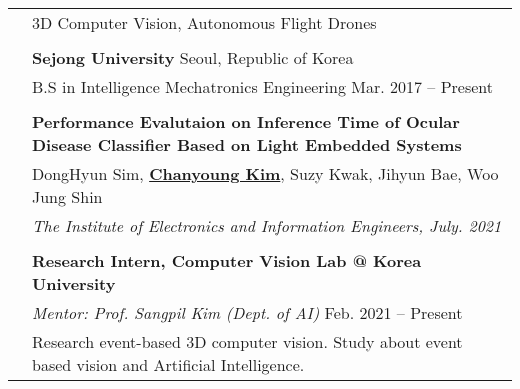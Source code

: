 \documentclass[letterpaper, 11pt]{article}
\begin{document}
\begin{longtable}{p{1.3in}p{4.8in}}


\nohyphens{\color{Violet}{Research interests}}
& 3D Computer Vision, Autonomous Flight Drones \\
& \\


\color{Violet}{Education} 
& \textbf{Sejong University} \hfill Seoul, Republic of Korea \\ 
& B.S in Intelligence Mechatronics Engineering \hfill Mar. 2017 -- Present \\
& \\




\nohyphens{\color{Violet}{Publications}} 

& \textbf{Performance Evalutaion on Inference 
Time of Ocular Disease Classifier Based on Light Embedded 
Systems} \\
& DongHyun Sim, \uline{\textbf{Chanyoung Kim}}, Suzy Kwak, Jihyun Bae, Woo Jung 
Shin \\
& \textit{The Institute of Electronics and Information Engineers, July. 
2021}\\
& \\



\nohyphens{\color{Violet}{Research experience}} 
& \textbf{Research Intern, Computer Vision Lab @ Korea University} \\
& {\it Mentor: Prof. Sangpil Kim (Dept. of AI)} \hfill Feb. 2021 -- Present \\
& Research event-based 3D computer vision. Study about event based vision and Artificial Intelligence.
& \\


\end{longtable}
\end{document}
